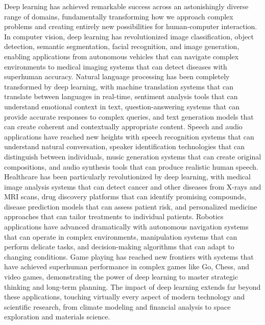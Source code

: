Deep learning has achieved remarkable success across an astonishingly diverse range of domains, fundamentally transforming how we approach complex problems and creating entirely new possibilities for human-computer interaction. In computer vision, deep learning has revolutionized image classification, object detection, semantic segmentation, facial recognition, and image generation, enabling applications from autonomous vehicles that can navigate complex environments to medical imaging systems that can detect diseases with superhuman accuracy. Natural language processing has been completely transformed by deep learning, with machine translation systems that can translate between languages in real-time, sentiment analysis tools that can understand emotional context in text, question-answering systems that can provide accurate responses to complex queries, and text generation models that can create coherent and contextually appropriate content. Speech and audio applications have reached new heights with speech recognition systems that can understand natural conversation, speaker identification technologies that can distinguish between individuals, music generation systems that can create original compositions, and audio synthesis tools that can produce realistic human speech. Healthcare has been particularly revolutionized by deep learning, with medical image analysis systems that can detect cancer and other diseases from X-rays and MRI scans, drug discovery platforms that can identify promising compounds, disease prediction models that can assess patient risk, and personalized medicine approaches that can tailor treatments to individual patients. Robotics applications have advanced dramatically with autonomous navigation systems that can operate in complex environments, manipulation systems that can perform delicate tasks, and decision-making algorithms that can adapt to changing conditions. Game playing has reached new frontiers with systems that have achieved superhuman performance in complex games like Go, Chess, and video games, demonstrating the power of deep learning to master strategic thinking and long-term planning. The impact of deep learning extends far beyond these applications, touching virtually every aspect of modern technology and scientific research, from climate modeling and financial analysis to space exploration and materials science.

